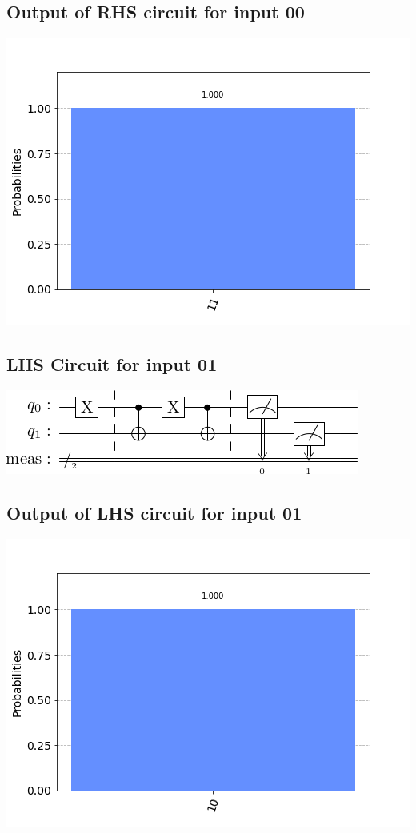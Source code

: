\documentclass[a4paper]{article}
\begin{document}
\begin{answer}[Question 1 b (a)]
        \subsection*{Output of RHS circuit for input 00}
        \includegraphics[scale = 0.5]{a200-out.png}
        \subsection*{LHS Circuit for input 01}
        \includegraphics[scale=0.5]{a101.png}
        \subsection*{Output of LHS circuit for input 01}
        \includegraphics[scale = 0.5]{a101-out.png}

\end{answer}
\end{document}
